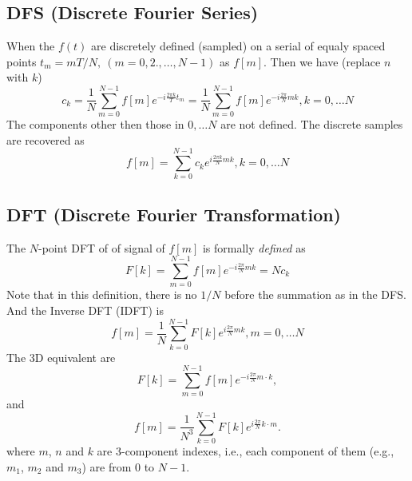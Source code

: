 \documentclass[11pt]{amsart}
\begin{document}
\subsection{DFS (Discrete Fourier  Series)}
When the $f(t)$ are discretely defined (sampled) on a serial of equaly spaced points $t_m = mT/N,~(m = 0, 2., \ldots, N-1)$ as $f[m]$. Then we have (replace $n$ with $k$)
\begin{equation}
c_k = \frac{1}{N} \sum_{m=0}^{N-1}f[m] e^{-i\frac{2\pi k}{T}t_m} = 
 \frac{1}{N} \sum_{m=0}^{N-1}f[m] e^{-i\frac{2\pi}{N}mk}, k = 0, \ldots N
\end{equation}
The components	other then those in $0, \ldots N$ are not defined. The discrete samples are recovered as
\begin{equation}
f[m] =  \sum_{k=0}^{N-1}c_k e^{i\frac{2\pi k}{N}mk}, k = 0, \ldots N
\end{equation}


\subsection{DFT (Discrete Fourier Transformation)}
The $N$-point DFT of of signal of $f[m]$ is formally \emph{defined} as
\begin{equation}
F[k] =  \sum_{m=0}^{N-1}f[m]e^{-i\frac{2\pi}{N}mk} = N c_k
\end{equation}
{\color{red}Note that in this definition, there is no $1/N$ before the summation as in the DFS.}
And the Inverse DFT (IDFT) is
\begin{equation}\label{idft}
f[m] = \frac{1}{N} \sum_{k=0}^{N-1}F[k] e^{i\frac{2\pi}{N}mk}, m = 0, \ldots N
\end{equation}
The 3D equivalent are
\begin{equation}
F[k] =  \sum_{m=0}^{N-1}f[m]e^{-i\frac{2\pi}{N}m\cdot k},
\end{equation}
and
\begin{equation}
f[m] = \frac{1}{N^3} \sum_{k=0}^{N-1}F[k] e^{i\frac{2\pi}{N}k\cdot m}.
\end{equation}
where $m$, $n$ and $k$ are 3-component indexes, i.e., each component of them (e.g., $m_1$, $m_2$ and $m_3$) are from $0$ to $N-1$.
\end{document}
